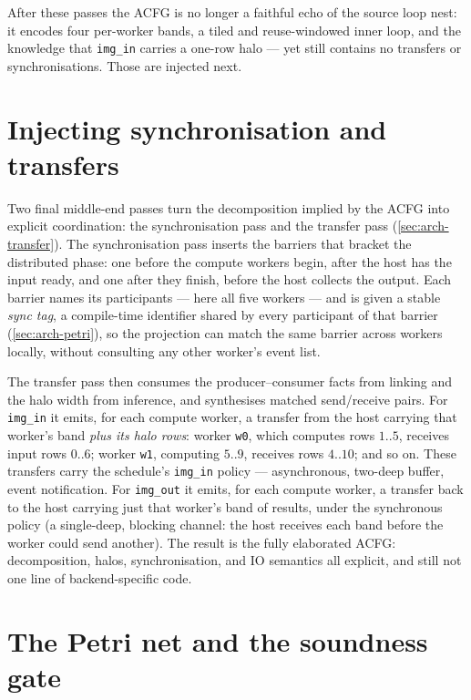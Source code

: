 

After these passes the ACFG is no longer a faithful echo of the source loop nest:
it encodes four per-worker bands, a tiled and reuse-windowed inner loop, and the
knowledge that \texttt{img\_in} carries a one-row halo --- yet still contains no
transfers or synchronisations. Those are injected next.

\section{Injecting synchronisation and transfers}\label{sec:wt-inject}

Two final middle-end passes turn the decomposition implied by the ACFG into
explicit coordination: the synchronisation pass and the transfer pass
(\cref{sec:arch-transfer}). The synchronisation pass inserts the barriers that
bracket the distributed phase: one before the compute workers begin, after the host
has the input ready, and one after they finish, before the host collects the
output. Each barrier names its participants --- here all five workers --- and is
given a stable \emph{sync tag}, a compile-time identifier shared by every
participant of that barrier (\cref{sec:arch-petri}), so the projection can match the
same barrier across workers locally, without consulting any other worker's event list.

The transfer pass then consumes the producer--consumer facts from linking and the
halo width from inference, and synthesises matched send/receive pairs. For
\texttt{img\_in} it emits, for each compute worker, a transfer from the host
carrying that worker's band \emph{plus its halo rows}: worker \texttt{w0}, which
computes rows $1..5$, receives input rows $0..6$; worker \texttt{w1}, computing
$5..9$, receives rows $4..10$; and so on. These transfers carry the schedule's
\texttt{img\_in} policy --- asynchronous, two-deep buffer, event notification. For
\texttt{img\_out} it emits, for each compute worker, a transfer back to the host
carrying just that worker's band of results, under the synchronous policy (a
single-deep, blocking channel: the host receives each band before the worker could
send another). The result is the fully elaborated ACFG: decomposition, halos, synchronisation, and IO
semantics all explicit, and still not one line of backend-specific code.

\section{The Petri net and the soundness gate}\label{sec:wt-net}

